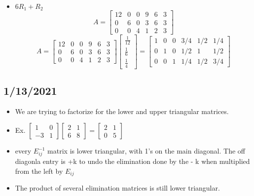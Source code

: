 \begin{itemize}
    \item $6R_1+R_2$
    $$A=\begin{bmatrix}12&0&0&9&6&3\\0&6&0&3&6&3\\0&0&4&1&2&3\end{bmatrix}$$
    $$A=\begin{bmatrix}12&0&0&9&6&3\\0&6&0&3&6&3\\0&0&4&1&2&3\end{bmatrix}\begin{bmatrix}\frac{1}{12}\\\frac{1}{6}\\\frac{1}{4}\end{bmatrix}=\begin{bmatrix}1&0&0&3/4&1/2&1/4\\0&1&0&1/2&1&1/2\\0&0&1&1/4&1/2&3/4\end{bmatrix}$$
\end{itemize}

\subsection{1/13/2021}
\begin{itemize}
    \item We are trying to factorize for the lower and upper triangular matrices.
    \item Ex. $\begin{bmatrix}1&0\\-3&1\end{bmatrix}\begin{bmatrix}2&1\\6&8\end{bmatrix}=\begin{bmatrix}2&1\\0&5\end{bmatrix}$
    \item every $E^{-1}_{ij}$ matrix is lower triangular, with 1's on the main diagonal. The off diagonla entry is +k to undo the elimination done by the - k when multiplied from the left by $E_{ij}$
    \item The product of several elimination matrices is still lower triangular.
\end{itemize}